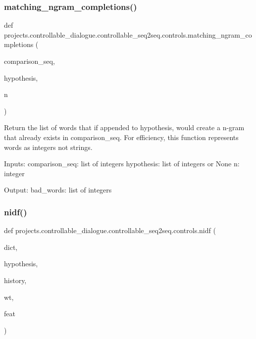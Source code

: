 \subsubsection{\texorpdfstring{matching\+\_\+ngram\+\_\+completions()}{matching\_ngram\_completions()}}
{\footnotesize\ttfamily def projects.\+controllable\+\_\+dialogue.\+controllable\+\_\+seq2seq.\+controls.\+matching\+\_\+ngram\+\_\+completions (\begin{DoxyParamCaption}\item[{}]{comparison\+\_\+seq,  }\item[{}]{hypothesis,  }\item[{}]{n }\end{DoxyParamCaption})}

\begin{DoxyVerb}Return the list of words that if appended to hypothesis, would create a n-gram that
already exists in comparison_seq. For efficiency, this function represents words as
integers not strings.

Inputs:
    comparison_seq: list of integers
    hypothesis: list of integers or None
    n: integer

Output:
    bad_words: list of integers
\end{DoxyVerb}
 \mbox{\label{namespaceprojects_1_1controllable__dialogue_1_1controllable__seq2seq_1_1controls_a27ef93e876c9c12b265bf2eefb65f058}} 
\subsubsection{\texorpdfstring{nidf()}{nidf()}}
{\footnotesize\ttfamily def projects.\+controllable\+\_\+dialogue.\+controllable\+\_\+seq2seq.\+controls.\+nidf (\begin{DoxyParamCaption}\item[{}]{dict,  }\item[{}]{hypothesis,  }\item[{}]{history,  }\item[{}]{wt,  }\item[{}]{feat }\end{DoxyParamCaption})}

